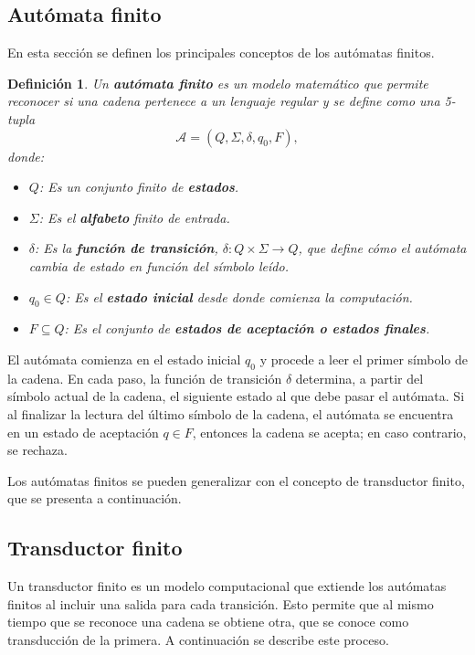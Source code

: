 \documentclass[12pt]{article}
\newtheorem{definition}{Definición}
\begin{document}
\subsection{Autómata finito}

En esta sección se definen los principales conceptos de los autómatas finitos.

\begin{definition}
  Un \textbf{autómata finito} \cite{authomataTheory} es un modelo matemático que permite reconocer si una cadena pertenece a un lenguaje regular y se define como una 5-tupla $$\mathcal{A} = (Q, \Sigma, \delta, q_0, F),$$ donde:
  
  \begin{itemize}
    \item $Q$: Es un conjunto finito de \textbf{estados}.
    \item $\Sigma$: Es el \textbf{alfabeto} finito de entrada.
    \item $\delta$: Es la \textbf{función de transición}, $\delta: Q \times \Sigma \to Q$, que define cómo el autómata cambia de estado en función del símbolo leído.
    \item $q_0 \in Q$: Es el \textbf{estado inicial} desde donde comienza la computación.
    \item $F \subseteq Q$: Es el conjunto de \textbf{estados de aceptación o estados finales}.
  \end{itemize}
\end{definition}


El autómata comienza en el estado inicial $q_0$ y procede a leer el primer símbolo de la cadena.  En cada paso, la función de transición $\delta$ determina, a partir del símbolo actual de la cadena, el siguiente estado al que debe pasar el autómata.  Si al finalizar la lectura del último símbolo de la cadena, el autómata se encuentra en un estado de aceptación $q \in F$, entonces la cadena se acepta; en caso contrario, se rechaza.

Los autómatas finitos se pueden generalizar con el concepto de transductor finito, que se presenta a continuación.

\subsection{Transductor finito}

Un transductor finito \cite{finite_transducer} es un modelo computacional que extiende los autómatas finitos al 
incluir una salida para cada transición. Esto permite que al mismo tiempo que se reconoce una cadena se obtiene otra, 
que se conoce como transducción de la primera. A continuación se describe este proceso.
\end{document}
